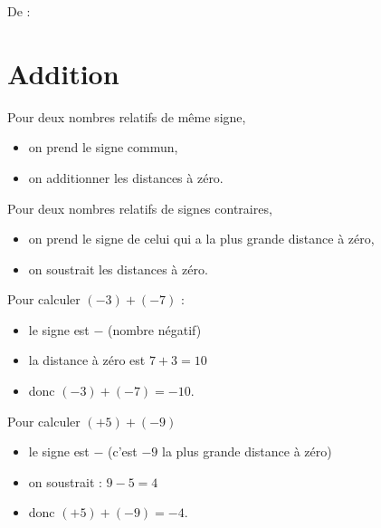 

De : \cite{VJNYooBKjymp}


\section{Addition}

\begin{definition}
    Pour  deux nombres relatifs de même signe,
    \begin{itemize}
        \item on prend le signe commun,
        \item on additionner les distances à zéro.
    \end{itemize}
    
    Pour  deux nombres relatifs de signes contraires,
    \begin{itemize}
        \item on prend le signe de celui qui a la plus grande distance à zéro,
        \item on soustrait les distances à zéro.
    \end{itemize}
\end{definition}

\begin{example}
    Pour calculer \( (-3)+(-7)\) :
    \begin{itemize}
        \item le signe est \( -\) (nombre négatif)
        \item la distance à zéro est \( 7+3=10\)
        \item donc \( (-3)+(-7)=-10\).
    \end{itemize}
    Pour calculer \( (+5)+(-9)\)
    \begin{itemize}
        \item le signe est \( -\) (c'est \( -9\) la plus grande distance à zéro)
        \item on soustrait : \( 9-5=4\)
        \item donc \( (+5)+(-9)=-4\).
    \end{itemize}
\end{example}

